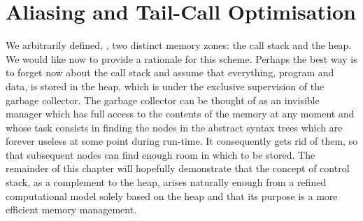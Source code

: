 
\chapter{Aliasing and Tail\hyp{}Call Optimisation}

We arbitrarily defined, , two distinct
memory zones: the call stack and the heap. We would like now to
provide a rationale for this scheme. Perhaps the best way is to forget
now about the call stack and assume that everything, program and data,
is stored in the heap, which is under the exclusive supervision of the
garbage collector. The garbage collector can be thought of as an
invisible manager which has full access to the contents of the memory
at any moment and whose task consists in finding the nodes in the
abstract syntax trees which are forever useless at some point during
run\hyp{}time. It consequently gets rid of them, so that subsequent
nodes can find enough room in which to be stored. The remainder of
this chapter will hopefully demonstrate that the concept of control
stack, as a complement to the heap, arises naturally enough from a
refined computational model solely based on the heap and that its
purpose is a more efficient memory management.

